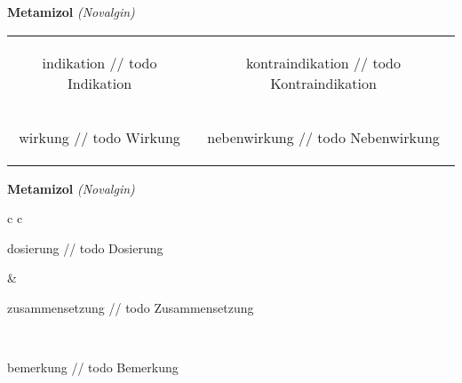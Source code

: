 \documentclass[12pt]{beamer}
\begin{document}
\begin{frame}{
    \textbf{Metamizol}
    \textit{(Novalgin)}
}
    \begin{tabular}{c c}
        \begin{beamercolorbox}[wd=\boxwidth\textwidth,ht=\boxheight\textheight,sep=1em]{indikation}
        // todo Indikation
        \end{beamercolorbox} & 
        \begin{beamercolorbox}[wd=\boxwidth\textwidth,ht=\boxheight\textheight,sep=1em]{kontraindikation}
        // todo Kontraindikation 
        \end{beamercolorbox} \\
        \begin{beamercolorbox}[wd=\boxwidth\textwidth,ht=\boxheight\textheight,sep=1em]{wirkung}
        // todo Wirkung
        \end{beamercolorbox} & 
        \begin{beamercolorbox}[wd=\boxwidth\textwidth,ht=\boxheight\textheight,sep=1em]{nebenwirkung}
        // todo Nebenwirkung
        \end{beamercolorbox} \\
    \end{tabular}
\end{frame}

\begin{frame}{
    \textbf{Metamizol}
    \textit{(Novalgin)}
}
    \begin{tabular}{c c}
        \begin{beamercolorbox}[wd=\boxwidth\textwidth,ht=\boxheight\textheight,sep=1em]{dosierung}
        // todo Dosierung
        \end{beamercolorbox} & 
        \begin{beamercolorbox}[wd=\boxwidth\textwidth,ht=\boxheight\textheight,sep=1em]{zusammensetzung}
        // todo Zusammensetzung
        \end{beamercolorbox} \\
        \begin{beamercolorbox}[wd=\textwidth,ht=\boxheight\textheight,sep=1em]{bemerkung}
        // todo Bemerkung
        \end{beamercolorbox} \\
    \end{tabular}
\end{frame}
\end{document}
